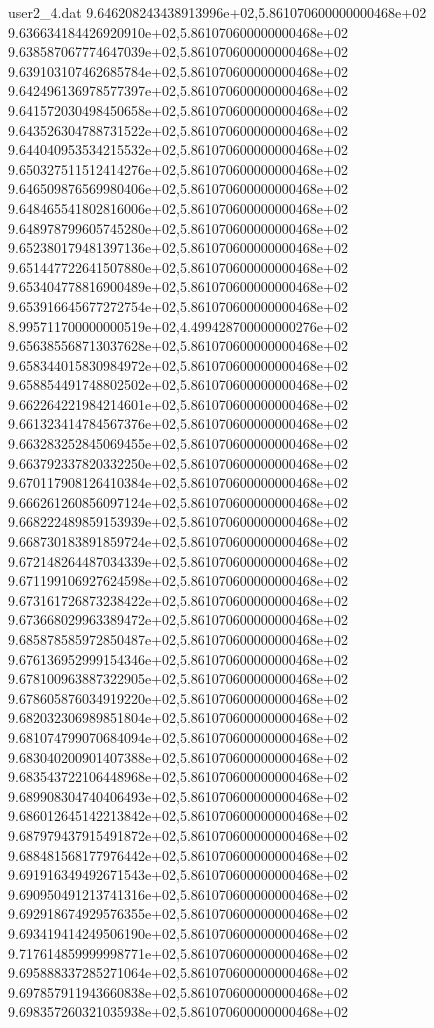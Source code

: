 \begin{filecontents}{user2_4.dat}
9.646208243438913996e+02,5.861070600000000468e+02
9.636634184426920910e+02,5.861070600000000468e+02
9.638587067774647039e+02,5.861070600000000468e+02
9.639103107462685784e+02,5.861070600000000468e+02
9.642496136978577397e+02,5.861070600000000468e+02
9.641572030498450658e+02,5.861070600000000468e+02
9.643526304788731522e+02,5.861070600000000468e+02
9.644040953534215532e+02,5.861070600000000468e+02
9.650327511512414276e+02,5.861070600000000468e+02
9.646509876569980406e+02,5.861070600000000468e+02
9.648465541802816006e+02,5.861070600000000468e+02
9.648978799605745280e+02,5.861070600000000468e+02
9.652380179481397136e+02,5.861070600000000468e+02
9.651447722641507880e+02,5.861070600000000468e+02
9.653404778816900489e+02,5.861070600000000468e+02
9.653916645677272754e+02,5.861070600000000468e+02
8.995711700000000519e+02,4.499428700000000276e+02
9.656385568713037628e+02,5.861070600000000468e+02
9.658344015830984972e+02,5.861070600000000468e+02
9.658854491748802502e+02,5.861070600000000468e+02
9.662264221984214601e+02,5.861070600000000468e+02
9.661323414784567376e+02,5.861070600000000468e+02
9.663283252845069455e+02,5.861070600000000468e+02
9.663792337820332250e+02,5.861070600000000468e+02
9.670117908126410384e+02,5.861070600000000468e+02
9.666261260856097124e+02,5.861070600000000468e+02
9.668222489859153939e+02,5.861070600000000468e+02
9.668730183891859724e+02,5.861070600000000468e+02
9.672148264487034339e+02,5.861070600000000468e+02
9.671199106927624598e+02,5.861070600000000468e+02
9.673161726873238422e+02,5.861070600000000468e+02
9.673668029963389472e+02,5.861070600000000468e+02
9.685878585972850487e+02,5.861070600000000468e+02
9.676136952999154346e+02,5.861070600000000468e+02
9.678100963887322905e+02,5.861070600000000468e+02
9.678605876034919220e+02,5.861070600000000468e+02
9.682032306989851804e+02,5.861070600000000468e+02
9.681074799070684094e+02,5.861070600000000468e+02
9.683040200901407388e+02,5.861070600000000468e+02
9.683543722106448968e+02,5.861070600000000468e+02
9.689908304740406493e+02,5.861070600000000468e+02
9.686012645142213842e+02,5.861070600000000468e+02
9.687979437915491872e+02,5.861070600000000468e+02
9.688481568177976442e+02,5.861070600000000468e+02
9.691916349492671543e+02,5.861070600000000468e+02
9.690950491213741316e+02,5.861070600000000468e+02
9.692918674929576355e+02,5.861070600000000468e+02
9.693419414249506190e+02,5.861070600000000468e+02
9.717614859999998771e+02,5.861070600000000468e+02
9.695888337285271064e+02,5.861070600000000468e+02
9.697857911943660838e+02,5.861070600000000468e+02
9.698357260321035938e+02,5.861070600000000468e+02

\end{filecontents}
